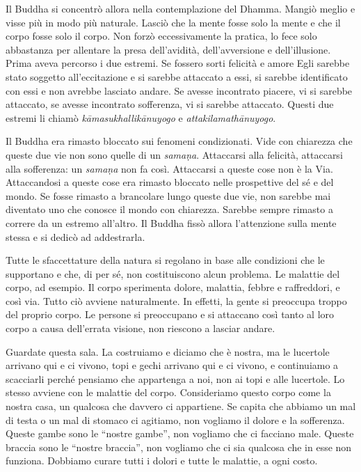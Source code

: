 Il Buddha si concentrò allora nella contemplazione del Dhamma. Mangiò
meglio e visse più in modo più naturale. Lasciò che la mente fosse solo
la mente e che il corpo fosse solo il corpo. Non forzò eccessivamente la
pratica, lo fece solo abbastanza per allentare la presa dell'avidità,
dell'avversione e dell'illusione. Prima aveva percorso i due estremi. Se
fossero sorti felicità e amore Egli sarebbe stato soggetto
all'eccitazione e si sarebbe attaccato a essi, si sarebbe identificato
con essi e non avrebbe lasciato andare. Se avesse incontrato piacere, vi
si sarebbe attaccato, se avesse incontrato sofferenza, vi si sarebbe
attaccato. Questi due estremi li chiamò \emph{kāmasukhallikānuyogo} e
\emph{attakilamathānuyogo}.

Il Buddha era rimasto bloccato sui fenomeni condizionati. Vide con
chiarezza che queste due vie non sono quelle di un \emph{samaṇa}.
Attaccarsi alla felicità, attaccarsi alla sofferenza: un \emph{samaṇa}
non fa così. Attaccarsi a queste cose non è la Via. Attaccandosi a
queste cose era rimasto bloccato nelle prospettive del sé e del mondo.
Se fosse rimasto a brancolare lungo queste due vie, non sarebbe mai
diventato uno che conosce il mondo con chiarezza. Sarebbe sempre rimasto
a correre da un estremo all'altro. Il Buddha fissò allora l'attenzione
sulla mente stessa e si dedicò ad addestrarla.

Tutte le sfaccettature della natura si regolano in base alle condizioni
che le supportano e che, di per sé, non costituiscono alcun problema. Le
malattie del corpo, ad esempio. Il corpo sperimenta dolore, malattia,
febbre e raffreddori, e così via. Tutto ciò avviene naturalmente. In
effetti, la gente si preoccupa troppo del proprio corpo. Le persone si
preoccupano e si attaccano così tanto al loro corpo a causa dell'errata
visione, non riescono a lasciar andare.

Guardate questa sala. La costruiamo e diciamo che è nostra, ma le
lucertole arrivano qui e ci vivono, topi e gechi arrivano qui e ci
vivono, e continuiamo a scacciarli perché pensiamo che appartenga a noi,
non ai topi e alle lucertole. Lo stesso avviene con le malattie del
corpo. Consideriamo questo corpo come la nostra casa, un qualcosa che
davvero ci appartiene. Se capita che abbiamo un mal di testa o un mal di
stomaco ci agitiamo, non vogliamo il dolore e la sofferenza. Queste
gambe sono le ``nostre gambe'', non vogliamo che ci facciano male.
Queste braccia sono le ``nostre braccia'', non vogliamo che ci sia
qualcosa che in esse non funziona. Dobbiamo curare tutti i dolori e
tutte le malattie, a ogni costo.

